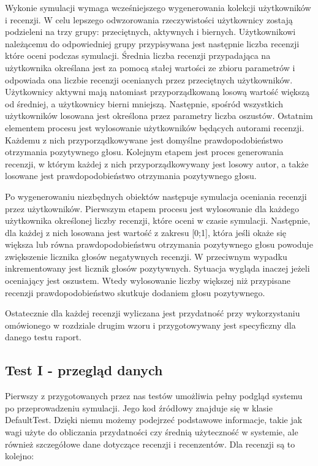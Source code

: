 Wykonie symulacji wymaga wcześniejszego wygenerowania kolekcji użytkowników i recenzji. W celu lepszego odwzorowania rzeczywistości użytkownicy zostają podzieleni na trzy grupy:  przeciętnych, aktywnych i biernych. Użytkownikowi należącemu do odpowiedniej grupy przypisywana jest następnie liczba recenzji które oceni podczas symulacji. Średnia liczba recenzji przypadająca na użytkownika określana jest za pomocą stałej wartości ze zbioru parametrów i odpowiada ona liczbie recenzji ocenianych przez przeciętnych użytkowników. Użytkownicy aktywni mają natomiast przyporządkowaną losową wartość większą od średniej, a użytkownicy bierni mniejszą. Następnie, spośród wszystkich użytkowników losowana jest określona przez parametry liczba oszustów. Ostatnim elementem procesu jest wylosowanie użytkowników będących autorami recenzji. Każdemu z nich przyporządkowywane jest domyślne prawdopodobieństwo otrzymania pozytywnego głosu. Kolejnym etapem jest proces generowania recenzji, w którym każdej z nich przyporządkowywany jest losowy autor, a także losowane jest prawdopodobieństwo otrzymania pozytywnego głosu.

Po wygenerowaniu niezbędnych obiektów następuje symulacja oceniania recenzji przez użytkowników. Pierwszym etapem procesu jest wylosowanie dla każdego użytkownika określonej liczby recenzji, które oceni w czasie symulacji. Następnie, dla każdej z nich losowana jest wartość z zakresu [0;1], która jeśli okaże się większa lub równa prawdopodobieństwu otrzymania pozytywnego głosu powoduje zwiększenie licznika głosów negatywnych recenzji. W przeciwnym wypadku inkrementowany jest licznik głosów pozytywnych. Sytuacja wygląda inaczej jeżeli oceniający jest oszustem. Wtedy wylosowanie liczby większej niż przypisane recenzji prawdopodobieństwo skutkuje dodaniem głosu pozytywnego. 

Ostatecznie dla każdej recenzji wyliczana jest przydatność przy wykorzystaniu omówionego w rozdziale drugim wzoru i przygotowywany jest specyficzny dla danego testu raport.

\subsection{Test I - przegląd danych}

Pierwszy z przygotowanych przez nas testów umożliwia pełny podgląd systemu po przeprowadzeniu symulacji. Jego kod źródłowy znajduje się w klasie DefaultTest. Dzięki niemu możemy podejrzeć podstawowe informacje, takie jak wagi użyte do obliczania przydatności czy średnią użyteczność w systemie, ale również szczegółowe dane dotyczące recenzji i recenzentów. Dla recenzji są to kolejno:

